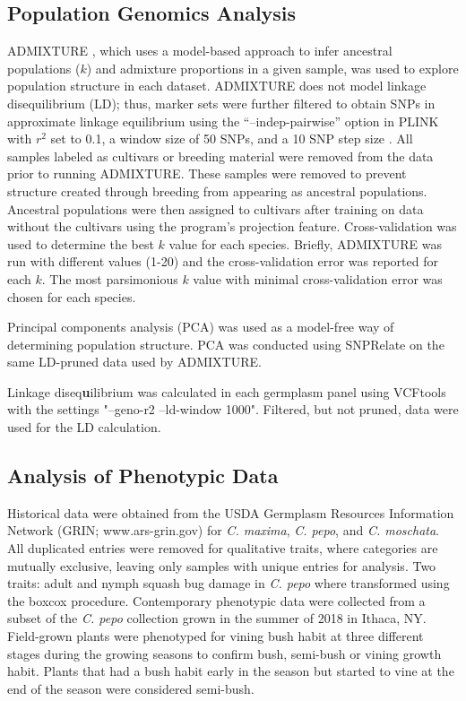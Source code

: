\documentclass[utf8]{FrontiersinHarvard} %
\begin{document}
\subsection{Population Genomics Analysis}
ADMIXTURE \citep{Alexander2011}, which uses a model-based approach to infer ancestral populations ($k$) and admixture proportions in a given sample, was used to explore population structure in each dataset. ADMIXTURE does not model linkage disequilibrium (LD); thus, marker sets were further filtered to obtain SNPs in approximate linkage equilibrium using the “–indep-pairwise” option in PLINK \citep{Purcell2007} with $r^{2}$ set to 0.1, a window size of 50 SNPs, and a 10 SNP step size . All samples labeled as cultivars or breeding material were removed from the data prior to running ADMIXTURE. These samples were removed to prevent structure created through breeding from appearing as ancestral populations. Ancestral populations were then assigned to cultivars after training on data without the cultivars using the program’s projection feature. Cross-validation was used to determine the best $k$ value for each species. Briefly, ADMIXTURE was run with different  values (1-20) and the cross-validation error was reported for each $k$. The most parsimonious $k$ value with minimal cross-validation error was chosen for each species.

Principal components analysis (PCA) was used as a model-free way of determining population structure. PCA was conducted using SNPRelate \citep{Zheng2012} on the same LD-pruned data used by ADMIXTURE.\textbf{}

Linkage diseq\textbf{u}ilibrium was calculated in each germplasm panel using VCFtools \citep{Danecek2011} with the settings "--geno-r2 --ld-window 1000". Filtered, but not pruned, data were used for the LD calculation.

\subsection{Analysis of Phenotypic Data}
Historical data were obtained from the USDA Germplasm Resources Information Network (GRIN; www.ars-grin.gov) for \textit{C. maxima}, \textit{C. pepo}, and \textit{C. moschata}. All duplicated entries were removed for qualitative traits, where categories are mutually exclusive, leaving only samples with unique entries for analysis. Two traits: adult and nymph squash bug damage in \textit{C. pepo} where transformed using the boxcox procedure. Contemporary phenotypic data were collected from a subset of the \textit{C. pepo} collection grown in the summer of 2018 in Ithaca, NY. Field-grown plants were phenotyped for vining bush habit at three different stages during the growing seasons to confirm bush, semi-bush or vining growth habit. Plants that had a bush habit early in the season but started to vine at the end of the season were considered semi-bush.
\end{document}
